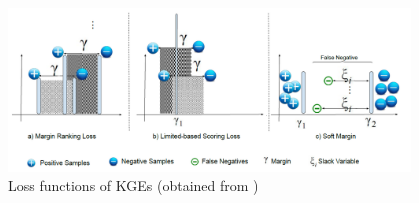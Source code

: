 \begin{figure}[t]
  \centering
    \includegraphics[width=0.95\textwidth]{figures/loss_functions.PNG}
  \caption{Loss functions of \acp{KGE} (obtained from \cite{9207513})}
  \label{fig:overview}
\end{figure}

